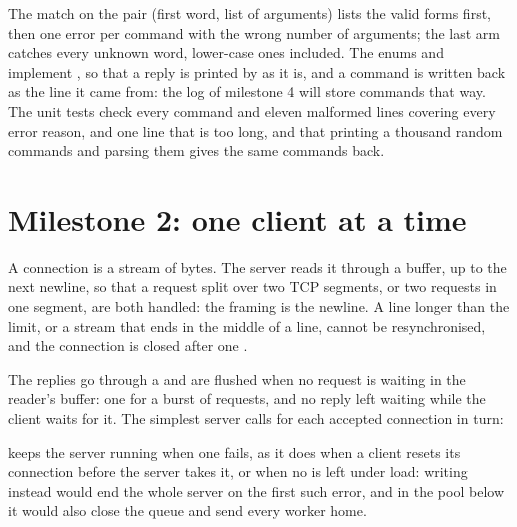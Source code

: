 The match on the pair (first word, list of arguments) lists the valid forms first, then one error per command with the
wrong number of arguments; the last arm catches every unknown word, lower-case ones included. The enums 
and  implement , so that a reply is printed by  as it is, and a command is written back
as the line it came from: the log of milestone 4 will store commands that way. The unit tests check every command and
eleven malformed lines covering every error reason, and one line that is too long, and that printing a thousand random commands and parsing them gives the
same commands back.

\section{Milestone 2: one client at a time}\label{sec:b2:project-key-value-server:single}

A connection is a stream of bytes. The server reads it through a buffer, up to the next newline, so that a request
split over two TCP segments, or two requests in one segment, are both handled: the framing is the newline. A line
longer than the limit, or a stream that ends in the middle of a line, cannot be resynchronised, and the connection is
closed after one .

\label{lst:b2:project-key-value-server:handle}

The replies go through a  and are flushed when no request is waiting in the reader's buffer: one
 for a burst of requests, and no reply left waiting while the client waits for it. The simplest server calls
 for each accepted connection in turn:

\label{lst:b2:project-key-value-server:one}

 keeps the server running when one  fails, as it does when a client resets its connection
before the server takes it, or when no  is left under load: writing  instead would end the
whole server on the first such error, and in the pool below it would also close the queue and send every worker home.

